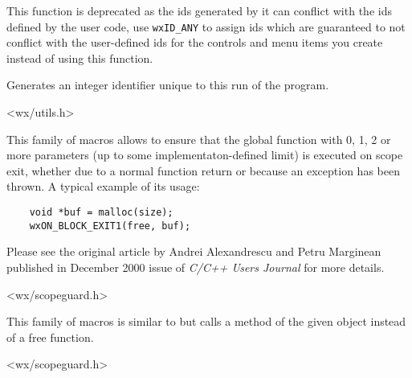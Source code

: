 
This function is deprecated as the ids generated by it can conflict with the
ids defined by the user code, use \texttt{wxID\_ANY} to assign ids which are
guaranteed to not conflict with the user-defined ids for the controls and menu
items you create instead of using this function.


Generates an integer identifier unique to this run of the program.


<wx/utils.h>


\label{wxonblockexit}


This family of macros allows to ensure that the global function 
with 0, 1, 2 or more parameters (up to some implementaton-defined limit) is
executed on scope exit, whether due to a normal function return or because an
exception has been thrown. A typical example of its usage:
\begin{verbatim}
    void *buf = malloc(size);
    wxON_BLOCK_EXIT1(free, buf);
\end{verbatim}

Please see the original article by Andrei Alexandrescu and Petru Marginean
published in December 2000 issue of \emph{C/C++ Users Journal} for more
details.


<wx/scopeguard.h>




\label{wxonblockexitobj}


This family of macros is similar to 
but calls a method of the given object instead of a free function.


<wx/scopeguard.h>



